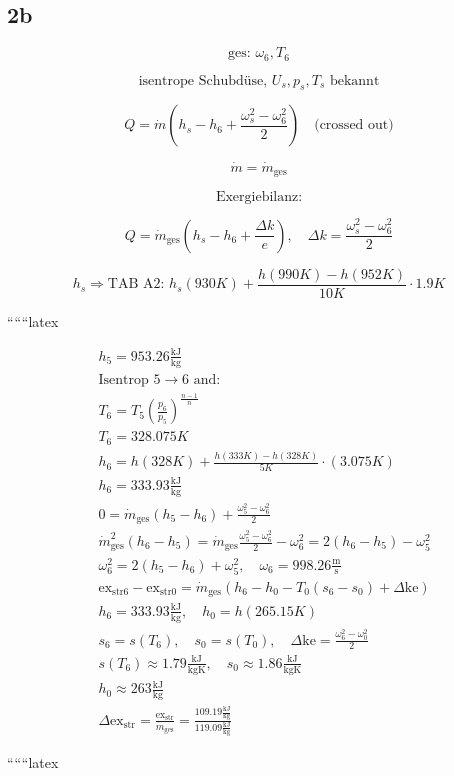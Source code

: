 

\subsection*{2b}

\[
\text{ges: } \omega_6, T_6
\]

\[
\text{isentrope Schubdüse, } U_s, p_s, T_s \text{ bekannt}
\]

\[
Q = \dot{m} \left( h_s - h_6 + \frac{\omega_s^2 - \omega_6^2}{2} \right) \quad \text{(crossed out)}
\]

\[
\dot{m} = \dot{m}_{\text{ges}}
\]

\[
\text{Exergiebilanz:}
\]

\[
Q = \dot{m}_{\text{ges}} \left( h_s - h_6 + \frac{\Delta k}{e} \right), \quad \Delta k = \frac{\omega_s^2 - \omega_6^2}{2}
\]

\[
h_s \Rightarrow \text{TAB A2: } h_s (930K) + \frac{h(990K) - h(952K)}{10K} \cdot 1.9K
\]

``````latex


\begin{align*}
&h_5 = 953.26 \frac{\text{kJ}}{\text{kg}} \\
&\text{Isentrop } 5 \rightarrow 6 \text{ and:} \\
&T_6 = T_5 \left( \frac{p_6}{p_5} \right)^{\frac{n-1}{n}} \\
&T_6 = 328.075K \\
&h_6 = h(328K) + \frac{h(333K) - h(328K)}{5K} \cdot (3.075K) \\
&h_6 = 333.93 \frac{\text{kJ}}{\text{kg}} \\
&0 = \dot{m}_{\text{ges}} (h_5 - h_6) + \frac{\omega_5^2 - \omega_6^2}{2} \\
&\dot{m}_{\text{ges}}^2 (h_6 - h_5) = \dot{m}_{\text{ges}} \frac{\omega_5^2 - \omega_6^2}{2} - \omega_6^2 = 2(h_6 - h_5) - \omega_5^2 \\
&\omega_6^2 = 2(h_5 - h_6) + \omega_5^2, \quad \omega_6 = 998.26 \frac{\text{m}}{\text{s}} \\
&\text{ex}_{\text{str}6} - \text{ex}_{\text{str}0} = \dot{m}_{\text{ges}} (h_6 - h_0 - T_0 (s_6 - s_0) + \Delta \text{ke}) \\
&h_6 = 333.93 \frac{\text{kJ}}{\text{kg}}, \quad h_0 = h(265.15K) \\
&s_6 = s(T_6), \quad s_0 = s(T_0), \quad \Delta \text{ke} = \frac{\omega_6^2 - \omega_0^2}{2} \\
&s(T_6) \approx 1.79 \frac{\text{kJ}}{\text{kgK}}, \quad s_0 \approx 1.86 \frac{\text{kJ}}{\text{kgK}} \\
&h_0 \approx 263 \frac{\text{kJ}}{\text{kg}} \\
&\Delta \text{ex}_{\text{str}} = \frac{\text{ex}_{\text{str}}}{\dot{m}_{\text{ges}}} = \frac{109.19 \frac{\text{kJ}}{\text{kg}}}{119.09 \frac{\text{kJ}}{\text{kg}}}
\end{align*}

``````latex